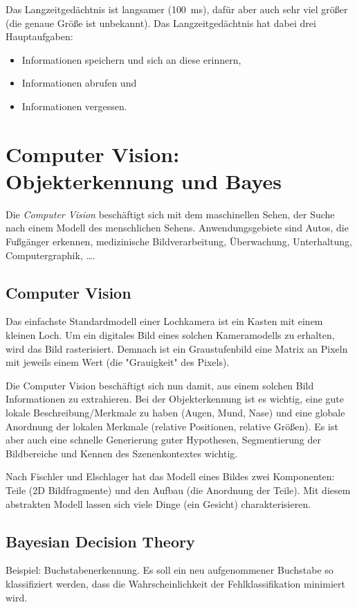 			Das Langzeitgedächtnis ist langsamer (\ca \SI{100}{\milli\second}), dafür aber auch sehr viel größer (die genaue Größe ist unbekannt). Das Langzeitgedächtnis hat dabei drei Hauptaufgaben:
			\begin{itemize}
				\item Informationen speichern und sich an diese erinnern,
				\item Informationen abrufen und
				\item Informationen vergessen.
			\end{itemize}

\chapter{Computer Vision: Objekterkennung und Bayes}
	Die \emph{Computer Vision} beschäftigt sich mit dem maschinellen Sehen, \dh der Suche nach einem Modell des menschlichen Sehens. Anwendungsgebiete sind \bspw Autos, die Fußgänger erkennen, medizinische Bildverarbeitung, Überwachung, Unterhaltung, Computergraphik, \dots.

	\section{Computer Vision}
		Das einfachste Standardmodell einer Lochkamera ist ein Kasten mit einem kleinen Loch. Um ein digitales Bild eines solchen Kameramodells zu erhalten, wird das Bild rasterisiert. Demnach ist ein Graustufenbild eine Matrix an Pixeln mit jeweils einem Wert (die "Grauigkeit" des Pixels).

		Die Computer Vision beschäftigt sich nun damit, aus einem solchen Bild Informationen zu extrahieren. Bei der Objekterkennung ist es wichtig, eine gute lokale Beschreibung/Merkmale zu haben (\zB Augen, Mund, Nase) und eine globale Anordnung der lokalen Merkmale (\zB relative Positionen, relative Größen). Es ist aber auch eine schnelle Generierung guter Hypothesen, Segmentierung der Bildbereiche und Kennen des Szenenkontextes wichtig.

		Nach Fischler und Elschlager hat das Modell eines Bildes zwei Komponenten: Teile (2D Bildfragmente) und den Aufbau (die Anordnung der Teile). Mit diesem abstrakten Modell lassen sich viele Dinge (\zB ein Gesicht) charakterisieren.

	\section{Bayesian Decision Theory}
		Beispiel: Buchstabenerkennung. Es soll ein neu aufgenommener Buchstabe so klassifiziert werden, dass die Wahrscheinlichkeit der Fehlklassifikation minimiert wird.

